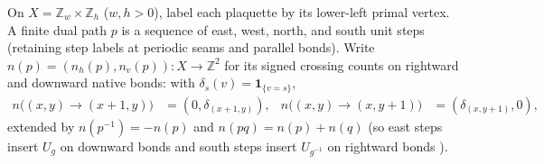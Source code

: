 
\begin{definition}%
    \label{def:peps_dual_flux_path}
    \leanok
    On $X=\mathbb Z_w\times\mathbb Z_h$ ($w,h>0$), label each plaquette by its
    lower-left primal vertex. A finite dual path $p$ is a sequence of east,
    west, north, and south unit steps (retaining step labels at periodic seams
    and parallel bonds). Write $n(p)=(n_h(p),n_v(p)):X\to\mathbb Z^2$ for its
    signed crossing counts on rightward and downward native bonds: with
    $\delta_s(v)=\mathbf1_{\{v=s\}}$,
    \begin{align}
        n\bigl((x,y)\to(x+1,y)\bigr) & =(0,\delta_{(x+1,y)}), &
        n\bigl((x,y)\to(x,y+1)\bigr) & =(\delta_{(x,y+1)},0),
        \label{eq:peps_dual_step_counts}
    \end{align}
    extended by $n(p^{-1})=-n(p)$ and $n(pq)=n(p)+n(q)$ (so east steps insert
    $U_g$ on downward bonds and south steps insert $U_{g^{-1}}$ on rightward
    bonds \cite[Definition~6.13]{Schuch2010PEPS}).
\end{definition}

